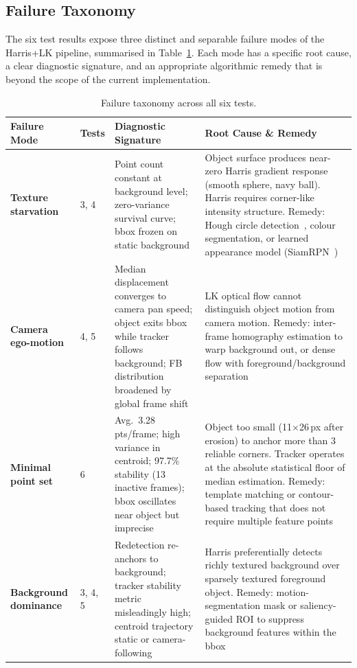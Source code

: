 \documentclass[12pt,a4paper]{article}
\begin{document}
\subsection{Failure Taxonomy}

The six test results expose three distinct and separable failure modes of the Harris+LK pipeline,
summarised in Table~\ref{tab:failure}. Each mode has a specific root cause, a clear diagnostic
signature, and an appropriate algorithmic remedy that is beyond the scope of the current
implementation.

\begin{table}[H]
\centering\small
\caption{Failure taxonomy across all six tests.}
\label{tab:failure}
\renewcommand{\arraystretch}{1.18}
\begin{tabularx}{\textwidth}{lllX}
\toprule
\rowcolor{accentteal!20}
\textbf{Failure Mode} & \textbf{Tests} & \textbf{Diagnostic Signature} & \textbf{Root Cause \& Remedy} \\
\midrule
\textbf{Texture starvation} & 3, 4 &
  Point count constant at background level; zero-variance survival curve; bbox frozen on static background &
  Object surface produces near-zero Harris gradient response (smooth sphere, navy ball). Harris requires corner-like intensity structure. Remedy: Hough circle detection~\cite{hough}, colour segmentation, or learned appearance model (SiamRPN~\cite{siamrpn}) \\
\midrule
\textbf{Camera ego-motion} & 4, 5 &
  Median displacement converges to camera pan speed; object exits bbox while tracker follows background; FB distribution broadened by global frame shift &
  LK optical flow cannot distinguish object motion from camera motion. Remedy: inter-frame homography estimation to warp background out, or dense flow with foreground/background separation \\
\midrule
\textbf{Minimal point set} & 6 &
  Avg.\ 3.28 pts/frame; high variance in centroid; 97.7\% stability (13 inactive frames); bbox oscillates near object but imprecise &
  Object too small (11$\times$26\,px after erosion) to anchor more than 3 reliable corners. Tracker operates at the absolute statistical floor of median estimation. Remedy: template matching or contour-based tracking that does not require multiple feature points \\
\midrule
\textbf{Background dominance} & 3, 4, 5 &
  Redetection re-anchors to background; tracker stability metric misleadingly high; centroid trajectory static or camera-following &
  Harris preferentially detects richly textured background over sparsely textured foreground object. Remedy: motion-segmentation mask or saliency-guided ROI to suppress background features within the bbox \\
\bottomrule
\end{tabularx}
\end{table}
\end{document}
